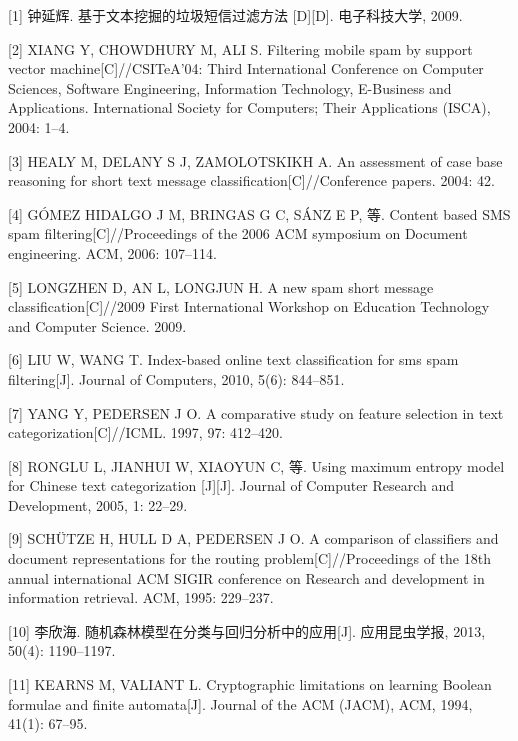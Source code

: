 \documentclass{article}
\begin{document}
\hypertarget{refs}{}
\hypertarget{ref-ux949fux5ef6ux8f892009ux57faux4e8eux6587ux672cux6316ux6398ux7684ux5783ux573eux77edux4fe1ux8fc7ux6ee4ux65b9ux6cd5}{}
{[}1{]} 钟延辉. 基于文本挖掘的垃圾短信过滤方法 {[}D{]}{[}D{]}.
电子科技大学, 2009.

\hypertarget{ref-xiang2004filtering}{}
{[}2{]} XIANG Y, CHOWDHURY M, ALI S. Filtering mobile spam by support
vector machine{[}C{]}//CSITeA'04: Third International Conference on
Computer Sciences, Software Engineering, Information Technology,
E-Business and Applications. International Society for Computers; Their
Applications (ISCA), 2004: 1--4.

\hypertarget{ref-healy2004assessment}{}
{[}3{]} HEALY M, DELANY S J, ZAMOLOTSKIKH A. An assessment of case base
reasoning for short text message classification{[}C{]}//Conference
papers. 2004: 42.

\hypertarget{ref-gomez2006content}{}
{[}4{]} GÓMEZ HIDALGO J M, BRINGAS G C, SÁNZ E P, 等. Content based SMS
spam filtering{[}C{]}//Proceedings of the 2006 ACM symposium on Document
engineering. ACM, 2006: 107--114.

\hypertarget{ref-longzhen2009new}{}
{[}5{]} LONGZHEN D, AN L, LONGJUN H. A new spam short message
classification{[}C{]}//2009 First International Workshop on Education
Technology and Computer Science. 2009.

\hypertarget{ref-liu2010index}{}
{[}6{]} LIU W, WANG T. Index-based online text classification for sms
spam filtering{[}J{]}. Journal of Computers, 2010, 5(6): 844--851.

\hypertarget{ref-yang1997comparative}{}
{[}7{]} YANG Y, PEDERSEN J O. A comparative study on feature selection
in text categorization{[}C{]}//ICML. 1997, 97: 412--420.

\hypertarget{ref-ronglu2005using}{}
{[}8{]} RONGLU L, JIANHUI W, XIAOYUN C, 等. Using maximum entropy model
for Chinese text categorization {[}J{]}{[}J{]}. Journal of Computer
Research and Development, 2005, 1: 22--29.

\hypertarget{ref-schutze1995comparison}{}
{[}9{]} SCHÜTZE H, HULL D A, PEDERSEN J O. A comparison of classifiers
and document representations for the routing problem{[}C{]}//Proceedings
of the 18th annual international ACM SIGIR conference on Research and
development in information retrieval. ACM, 1995: 229--237.

\hypertarget{ref-ux674eux6b23ux6d772013ux968fux673aux68eeux6797ux6a21ux578bux5728ux5206ux7c7bux4e0eux56deux5f52ux5206ux6790ux4e2dux7684ux5e94ux7528}{}
{[}10{]} 李欣海. 随机森林模型在分类与回归分析中的应用{[}J{]}.
应用昆虫学报, 2013, 50(4): 1190--1197.

\hypertarget{ref-kearns1994cryptographic}{}
{[}11{]} KEARNS M, VALIANT L. Cryptographic limitations on learning
Boolean formulae and finite automata{[}J{]}. Journal of the ACM (JACM),
ACM, 1994, 41(1): 67--95.
\end{document}
